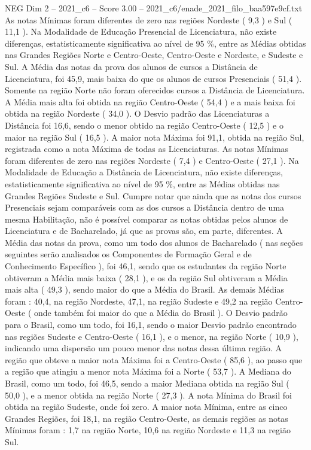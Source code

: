 \begin{textsample}{NEG Dim 2 – 2021\_c6 – Score 3.00 – 2021\_c6/enade\_2021\_filo\_baa597e9cf.txt}
As notas Mínimas foram diferentes de zero nas regiões Nordeste ( 9,3 ) e Sul ( 11,1 ).
Na Modalidade de Educação Presencial de Licenciatura, não existe diferenças, estatisticamente significativa ao nível de 95 \%, entre as Médias obtidas nas Grandes Regiões Norte e Centro-Oeste, Centro-Oeste e Nordeste, e Sudeste e Sul.
A Média das notas da prova dos alunos de cursos a Distância de Licenciatura, foi 45,9, mais baixa do que os alunos de cursos Presenciais ( 51,4 ).
Somente na região Norte não foram oferecidos cursos a Distância de Licenciatura.
A Média mais alta foi obtida na região Centro-Oeste ( 54,4 ) e a mais baixa foi obtida na região Nordeste ( 34,0 ).
O Desvio padrão das Licenciaturas a Distância foi 16,6, sendo o menor obtido na região Centro-Oeste ( 12,5 ) e o maior na região Sul ( 16,5 ).
A maior nota Máxima foi 91,1, obtida na região Sul, registrada como a nota Máxima de todas as Licenciaturas.
As notas Mínimas foram diferentes de zero nas regiões Nordeste ( 7,4 ) e Centro-Oeste ( 27,1 ).
Na Modalidade de Educação a Distância de Licenciatura, não existe diferenças, estatisticamente significativa ao nível de 95 \%, entre as Médias obtidas nas Grandes Regiões Sudeste e Sul.
Cumpre notar que ainda que as notas dos cursos Presenciais sejam comparáveis com as dos cursos a Distância dentro de uma mesma Habilitação, não é possível comparar as notas obtidas pelos alunos de Licenciatura e de Bacharelado, já que as provas são, em parte, diferentes.
A Média das notas da prova, como um todo dos alunos de Bacharelado ( nas seções seguintes serão analisados os Componentes de Formação Geral e de Conhecimento Específico ), foi 46,1, sendo que os estudantes da região Norte obtiveram a Média mais baixa ( 28,1 ), e os da região Sul obtiveram a Média mais alta ( 49,3 ), sendo maior do que a Média do Brasil.
As demais Médias foram : 40,4, na região Nordeste, 47,1, na região Sudeste e 49,2 na região Centro-Oeste ( onde também foi maior do que a Média do Brasil ).
O Desvio padrão para o Brasil, como um todo, foi 16,1, sendo o maior Desvio padrão encontrado nas regiões Sudeste e Centro-Oeste ( 16,1 ), e o menor, na região Norte ( 10,9 ), indicando uma dispersão um pouco menor das notas dessa última região.
A região que obteve a maior nota Máxima foi a Centro-Oeste ( 85,6 ), ao passo que a região que atingiu a menor nota Máxima foi a Norte ( 53,7 ).
A Mediana do Brasil, como um todo, foi 46,5, sendo a maior Mediana obtida na região Sul ( 50,0 ), e a menor obtida na região Norte ( 27,3 ).
A nota Mínima do Brasil foi obtida na região Sudeste, onde foi zero.
A maior nota Mínima, entre as cinco Grandes Regiões, foi 18,1, na região Centro-Oeste, as demais regiões as notas Mínimas foram : 1,7 na região Norte, 10,6 na região Nordeste e 11,3 na região Sul.

\end{textsample}
